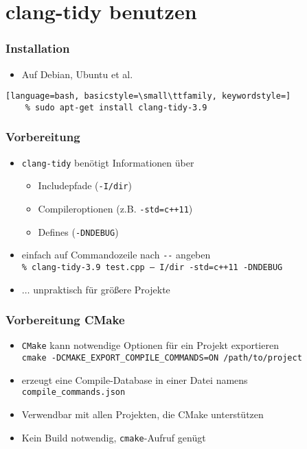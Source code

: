 \documentclass[aspectratio=169]{beamer}
\begin{document}
\section{clang-tidy benutzen}
\begin{frame}[fragile]
  \frametitle{Installation}
  \begin{itemize}
    \item Auf Debian, Ubuntu et al.
  \end{itemize}
  \begin{lstlisting}[language=bash, basicstyle=\small\ttfamily, keywordstyle=]
    % sudo apt-get install clang-tidy-3.9
  \end{lstlisting}
\end{frame}
\begin{frame}
  \frametitle{Vorbereitung}
  \begin{itemize}
  \item \texttt{clang-tidy} benötigt Informationen über \pause
    \begin{itemize}
    \item Includepfade (\texttt{-I/dir})
      \pause
    \item Compileroptionen (z.B. \texttt{-std=c++11})
      \pause
    \item Defines (\texttt{-DNDEBUG})
    \end{itemize}
    \pause
  \item einfach auf Commandozeile nach \texttt{-{}-} angeben\\
    \qquad \texttt{\% clang-tidy-3.9 test.cpp -- I/dir -std=c++11 -DNDEBUG}
  \item $\ldots{}$ unpraktisch für größere Projekte
  \end{itemize}
\end{frame}
\begin{frame}
  \frametitle{Vorbereitung CMake}
  \begin{itemize}
  \item \texttt{CMake} kann notwendige Optionen für ein Projekt exportieren\\
    \pause \texttt{cmake -DCMAKE\_EXPORT\_COMPILE\_COMMANDS=ON /path/to/project}
    \pause
  \item erzeugt eine Compile-Database in einer Datei namens \texttt{compile\_commands.json}
  \item Verwendbar mit allen Projekten, die CMake unterstützen
  \item Kein Build notwendig, \texttt{cmake}-Aufruf genügt
  \end{itemize}
\end{frame}
\end{document}
